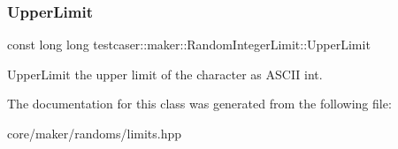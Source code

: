 \subsubsection{\texorpdfstring{UpperLimit}{UpperLimit}}
{\footnotesize\ttfamily const long long testcaser\+::maker\+::\+Random\+Integer\+Limit\+::\+Upper\+Limit}



Upper\+Limit the upper limit of the character as A\+S\+C\+II int. 



The documentation for this class was generated from the following file\+:\begin{DoxyCompactItemize}
\item 
core/maker/randoms/limits.\+hpp\end{DoxyCompactItemize}
